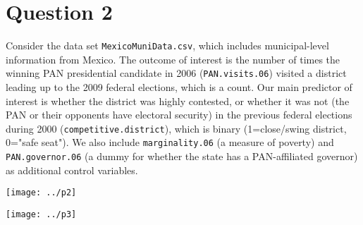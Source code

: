 \documentclass[12pt,letterpaper]{article}
\begin{document}
\section*{Question 2} 
\vspace{.25cm}

\noindent Consider the data set \texttt{MexicoMuniData.csv}, which includes municipal-level information from Mexico. The outcome of interest is the number of times the winning PAN presidential candidate in 2006 (\texttt{PAN.visits.06}) visited a district leading up to the 2009 federal elections, which is a count. Our main predictor of interest is whether the district was highly contested, or whether it was not (the PAN or their opponents have electoral security) in the previous federal elections during 2000 (\texttt{competitive.district}), which is binary (1=close/swing district, 0="safe seat"). We also include \texttt{marginality.06} (a measure of poverty) and \texttt{PAN.governor.06} (a dummy for whether the state has a PAN-affiliated governor) as additional control variables. 
     

	\texttt{[image: ../p2]}

     
    
	\texttt{[image: ../p3]}
\end{document}
